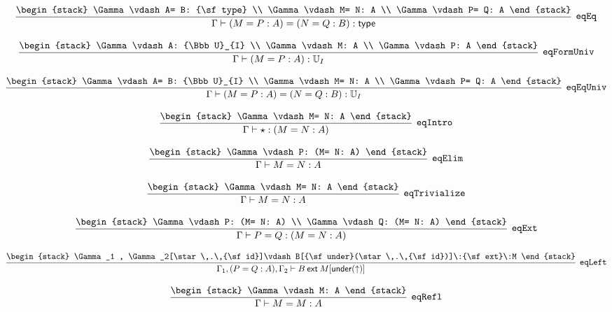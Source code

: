 \[
\infer[{\tt eqEq}]{\Gamma \vdash (M= P: A)= (N= Q: B): {\sf type}}{
\begin{stack}
\Gamma \vdash A= B: {\sf type}
\\
\Gamma \vdash M= N: A
\\
\Gamma \vdash P= Q: A
\end{stack}}
\]

\[
\infer[{\tt eqFormUniv}]{\Gamma \vdash (M= P: A): {\Bbb U}_{I}}{
\begin{stack}
\Gamma \vdash A: {\Bbb U}_{I}
\\
\Gamma \vdash M: A
\\
\Gamma \vdash P: A
\end{stack}}
\]

\[
\infer[{\tt eqEqUniv}]{\Gamma \vdash (M= P: A)= (N= Q: B): {\Bbb U}_{I}}{
\begin{stack}
\Gamma \vdash A= B: {\Bbb U}_{I}
\\
\Gamma \vdash M= N: A
\\
\Gamma \vdash P= Q: A
\end{stack}}
\]

\[
\infer[{\tt eqIntro}]{\Gamma \vdash \star : (M= N: A)}{
\begin{stack}
\Gamma \vdash M= N: A
\end{stack}}
\]

\[
\infer[{\tt eqElim}]{\Gamma \vdash M= N: A}{
\begin{stack}
\Gamma \vdash P: (M= N: A)
\end{stack}}
\]

\[
\infer[{\tt eqTrivialize}]{\Gamma \vdash M= N: A}{
\begin{stack}
\Gamma \vdash M= N: A
\end{stack}}
\]

\[
\infer[{\tt eqExt}]{\Gamma \vdash P= Q: (M= N: A)}{
\begin{stack}
\Gamma \vdash P: (M= N: A)
\\
\Gamma \vdash Q: (M= N: A)
\end{stack}}
\]

\[
\infer[{\tt eqLeft}]{\Gamma_1 ,(P= Q: A), \Gamma_2 \vdash B\:{\sf ext}\:M[{\sf under}(\uparrow )]}{
\begin{stack}
\Gamma_1 , \Gamma_2[\star \,.\,{\sf id}]\vdash B[{\sf under}(\star \,.\,{\sf id})]\:{\sf ext}\:M
\end{stack}}
\]

\[
\infer[{\tt eqRefl}]{\Gamma \vdash M= M: A}{
\begin{stack}
\Gamma \vdash M: A
\end{stack}}
\]

